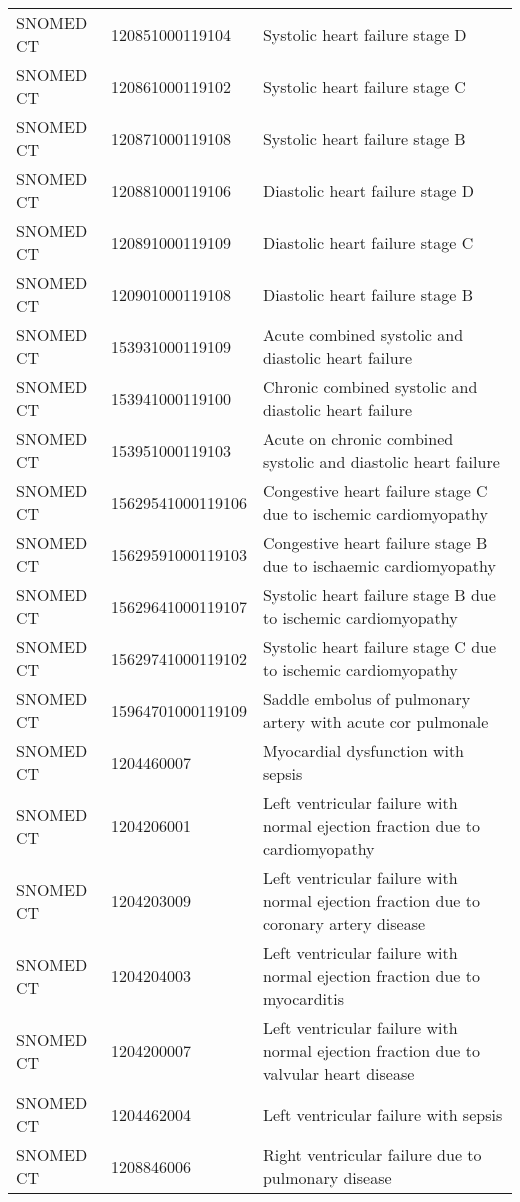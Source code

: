 \begin{longtable}{p{}p{}p{}}
  SNOMED CT & 120851000119104 & Systolic heart failure stage D \\ 
  SNOMED CT & 120861000119102 & Systolic heart failure stage C \\ 
  SNOMED CT & 120871000119108 & Systolic heart failure stage B \\ 
  SNOMED CT & 120881000119106 & Diastolic heart failure stage D \\ 
  SNOMED CT & 120891000119109 & Diastolic heart failure stage C \\ 
  SNOMED CT & 120901000119108 & Diastolic heart failure stage B \\ 
  SNOMED CT & 153931000119109 & Acute combined systolic and diastolic heart failure \\ 
  SNOMED CT & 153941000119100 & Chronic combined systolic and diastolic heart failure \\ 
  SNOMED CT & 153951000119103 & Acute on chronic combined systolic and diastolic heart failure \\ 
  SNOMED CT & 15629541000119106 & Congestive heart failure stage C due to ischemic cardiomyopathy \\ 
  SNOMED CT & 15629591000119103 & Congestive heart failure stage B due to ischaemic cardiomyopathy \\ 
  SNOMED CT & 15629641000119107 & Systolic heart failure stage B due to ischemic cardiomyopathy \\ 
  SNOMED CT & 15629741000119102 & Systolic heart failure stage C due to ischemic cardiomyopathy \\ 
  SNOMED CT & 15964701000119109 & Saddle embolus of pulmonary artery with acute cor pulmonale \\ 
  SNOMED CT & 1204460007 & Myocardial dysfunction with sepsis \\ 
  SNOMED CT & 1204206001 & Left ventricular failure with normal ejection fraction due to cardiomyopathy \\ 
  SNOMED CT & 1204203009 & Left ventricular failure with normal ejection fraction due to coronary artery disease \\ 
  SNOMED CT & 1204204003 & Left ventricular failure with normal ejection fraction due to myocarditis \\ 
  SNOMED CT & 1204200007 & Left ventricular failure with normal ejection fraction due to valvular heart disease \\ 
  SNOMED CT & 1204462004 & Left ventricular failure with sepsis \\ 
  SNOMED CT & 1208846006 & Right ventricular failure due to pulmonary disease \\ 

\end{longtable}
